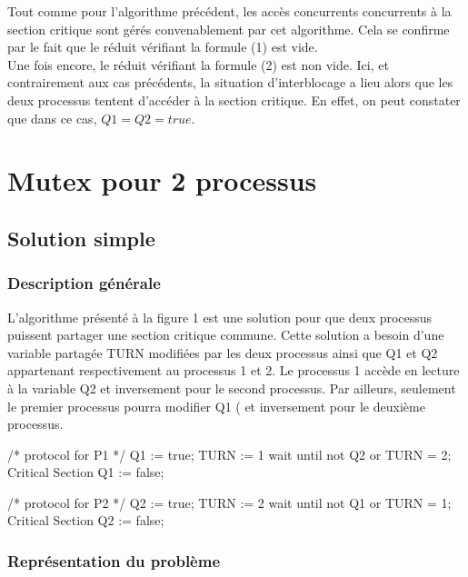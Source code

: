 \documentclass[a4paper]{report}
\begin{document}
Tout comme pour l'algorithme précédent, les accès concurrents concurrents à la section critique sont gérés convenablement par cet algorithme.
Cela se confirme par le fait que le réduit vérifiant la formule (1) est vide.
\\
Une fois encore, le réduit vérifiant la formule (2) est non vide.
Ici, et contrairement aux cas précédents, la situation d'interblocage a lieu alors que les deux processus tentent d'accéder à la section critique.
En effet, on peut constater que dans ce cas, $Q1 = Q2 = true$.

\chapter{Mutex pour 2 processus} 
\section{Solution simple}
\subsection{Description générale}
L'algorithme présenté à la figure 1 est une solution pour que deux processus puissent partager une section critique commune. Cette solution a besoin d'une variable partagée TURN modifiées par les deux processus ainsi que Q1 et Q2 appartenant respectivement au processus 1 et 2. Le processus 1 accède en lecture à la variable Q2 et inversement pour le second processus. Par ailleurs, seulement le premier processus pourra modifier Q1 ( et inversement pour le deuxième processus. 

\begin{minipage}{0.5\textwidth}
\flushleft
\renewcommand{\verbatimtabsize}{3}
\begin{listing}[1]{1}
/* protocol for P1 */
Q1 := true;
TURN := 1
wait until not Q2 or TURN = 2;
Critical Section
Q1 := false;
\end{listing}
\renewcommand{\verbatimtabsize}{3}
\end{minipage}
\begin{minipage}{0.5\textwidth}
\flushright
\begin{listing}[1]{1}
/* protocol for P2 */
Q2 := true;
TURN := 2
wait until not Q1 or TURN = 1;
Critical Section
Q2 := false;
\end{listing}
\end{minipage}

\subsection{Représentation du problème}
\end{document}
